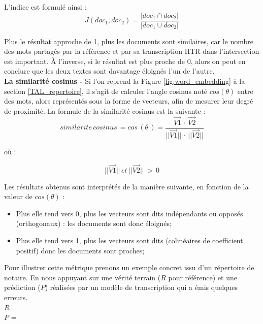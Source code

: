 L'indice est formulé ainsi : $$ J(doc_1,doc_2) = \frac{|doc_1 \cap doc_2|}{|doc_1 \cup doc_2|} $$

Plus le résultat approche de 1, plus les documents sont similaires, car le nombre des mots partagés par la référence et par sa transcription HTR dans l'intersection est important. À l'inverse, si le résultat est plus proche de 0, alors on peut en conclure que les deux textes sont davantage éloignés l'un de l'autre.\\

\textbf{La similarité cosinus -} Si l'on reprend la Figure \ref{fig:word_embedding} à la section \ref{TAL_repertoire}, il s'agit de calculer l'angle cosinus noté $cos(\theta)$ entre des mots, alors représentés sous la forme de vecteurs, afin de mesurer leur degré de proximité. La formule de la similarité cosinus est la suivante : $$ similarite\, cosinus \, = cos\, (\theta\,) = \frac{\overrightarrow{V1}\, \cdot \,\overrightarrow{V2}}{||\overrightarrow{V1}||\, \cdot \,||\overrightarrow{V2}||} $$

où : 

$$ ||\overrightarrow{V1}||\, et\, ||\overrightarrow{V2}||\, >\, 0 $$

Les résultats obtenus sont interprétés de la manière suivante, en fonction de la valeur de $cos(\theta)$ :

\begin{itemize}
    \item Plus elle tend vers 0, plus les vecteurs sont dits indépendants ou opposés (orthogonaux) : les documents sont donc éloignés;
    \item Plus elle tend vers 1, plus les vecteurs sont dits (colinéaires de coefficient positif) donc les documents sont proches;
\end{itemize}

Pour illustrer cette métrique prenons un exemple concret issu d'un répertoire de notaire. En nous appuyant sur une vérité terrain ($R$ pour référence) et une prédiction ($P$) réalisées par un modèle de transcription qui a émis quelques erreurs.\\

$R$ = \\

$P$ = \\


